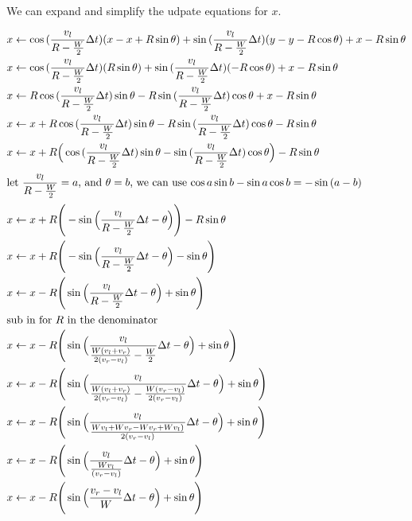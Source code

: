 \documentclass{article}
\begin{document}
We can expand and simplify the udpate equations for $x$.

\begin{align}
  x &\leftarrow \cos{(\dfrac{v_l}{R-\frac{W}{2}}\Delta t)}(x-x+R\sin{\theta})+\sin{(\dfrac{v_l}{R-\frac{W}{2}}\Delta t)}(y-y-R\cos{\theta}) + x-R\sin{\theta} \\
  x &\leftarrow \cos{(\dfrac{v_l}{R-\frac{W}{2}}\Delta t)}(R\sin{\theta})+\sin{(\dfrac{v_l}{R-\frac{W}{2}}\Delta t)}(-R\cos{\theta}) + x-R\sin{\theta} \\
  x &\leftarrow R\cos{(\dfrac{v_l}{R-\frac{W}{2}}\Delta t)}\sin{\theta}-R\sin{(\dfrac{v_l}{R-\frac{W}{2}}\Delta t)}\cos{\theta} + x-R\sin{\theta} \\
  x &\leftarrow x+R\cos{(\dfrac{v_l}{R-\frac{W}{2}}\Delta t)}\sin{\theta}-R\sin{(\dfrac{v_l}{R-\frac{W}{2}}\Delta t)}\cos{\theta}-R\sin{\theta} \\
  x &\leftarrow x+R\Big(\cos{(\dfrac{v_l}{R-\frac{W}{2}}\Delta t)}\sin{\theta}-\sin{(\dfrac{v_l}{R-\frac{W}{2}}\Delta t)}\cos{\theta}\Big)-R\sin{\theta} \\
  \shortintertext{let $\dfrac{v_l}{R-\frac{W}{2}}=a$, and $\theta=b$, we can use $\cos{a}\sin{b}-\sin{a}\cos{b}=-\sin{(a-b)}$}
  x &\leftarrow x+R\Bigg(-\sin{\Big(\dfrac{v_l}{R-\frac{W}{2}}\Delta t-\theta}\Big)\Bigg)-R\sin{\theta} \\
  x &\leftarrow x+R\Bigg(-\sin{\Big(\dfrac{v_l}{R-\frac{W}{2}}\Delta t-\theta}\Big)-\sin{\theta}\Bigg) \\
  x &\leftarrow x-R\Bigg(\sin{\Big(\dfrac{v_l}{R-\frac{W}{2}}\Delta t-\theta}\Big)+\sin{\theta}\Bigg) \\
  \shortintertext{sub in for $R$ in the denominator}
  x &\leftarrow x-R\Bigg(\sin{\Big(\dfrac{v_l}{\frac{W(v_l+v_r)}{2(v_r-v_l)}-\frac{W}{2}}\Delta t-\theta}\Big)+\sin{\theta}\Bigg) \\
  x &\leftarrow x-R\Bigg(\sin{\Big(\dfrac{v_l}{\frac{W(v_l+v_r)}{2(v_r-v_l)}-\frac{W(v_r-v_l)}{2(v_r-v_l)}}\Delta t-\theta\Big)}+\sin{\theta}\Bigg) \\
  x &\leftarrow x-R\Bigg(\sin{\Big(\dfrac{v_l}{\frac{Wv_l+Wv_r-Wv_r+Wv_l)}{2(v_r-v_l)}}\Delta t-\theta\Big)}+\sin{\theta}\Bigg) \\
  x &\leftarrow x-R\Bigg(\sin{\Big(\dfrac{v_l}{\frac{Wv_l}{(v_r-v_l)}}\Delta t-\theta\Big)}+\sin{\theta}\Bigg) \\
  x &\leftarrow x-R\Bigg(\sin{\Big(\frac{v_r-v_l}{W}\Delta t-\theta\Big)}+\sin{\theta}\Bigg)
\end{align}
\end{document}
